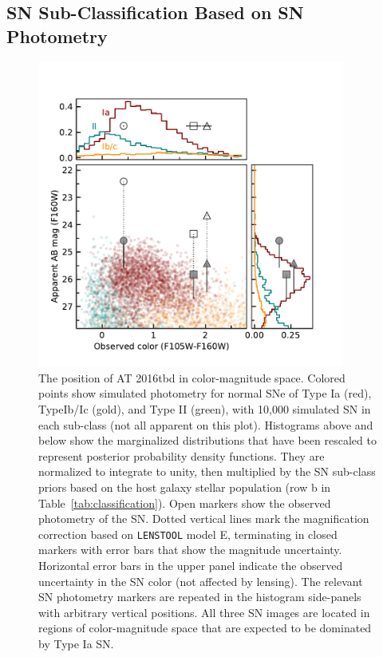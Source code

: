 \documentclass[12pt]{article}
\def\SNABC{AT 2016tbd\xspace}
\def\lenstool{{\tt LENSTOOL}\xspace}
\begin{document}
\subsection*{SN Sub-Classification Based on SN Photometry}

\begin{figure}
    \centering
    \includegraphics[width=0.9\textwidth]{Paper/Figures/colormag_classification_supplement.pdf}
    \caption{The position of \SNABC in color-magnitude space.
    Colored points show simulated photometry for normal SNe of Type Ia (red), TypeIb/Ic (gold), and Type II (green), with 10,000 simulated SN in each sub-class (not all apparent on this plot).  Histograms above and below show the marginalized distributions that have been rescaled to represent posterior probability density functions. They are normalized to integrate to unity, then multiplied by the SN sub-class priors based on the host galaxy stellar population (row b in Table~\ref{tab:classification}).  Open markers show the observed photometry of the SN. Dotted vertical lines mark the magnification correction based on \lenstool model E, terminating in closed markers with error bars that show the magnitude uncertainty.  Horizontal error bars in the upper panel indicate the observed uncertainty in 
    the SN color (not affected by lensing).  The relevant SN photometry markers are repeated in the histogram side-panels with arbitrary vertical positions.  All three SN images are located in regions of color-magnitude space that are expected to be dominated by Type Ia SN.}
    \label{fig:colormag_classification_supplement}
\end{figure}
\end{document}
